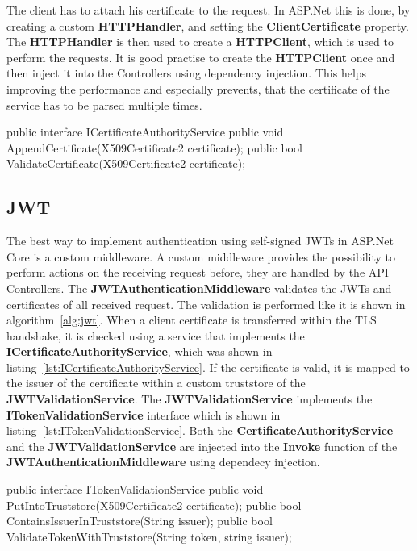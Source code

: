 The client has to attach his certificate to the request.
In ASP.Net this is done, by creating a custom \textbf{HTTPHandler}, and setting the \textbf{ClientCertificate} property.
The \textbf{HTTPHandler} is then used to create a \textbf{HTTPClient}, which is used to perform the requests.
It is good practise to create the \textbf{HTTPClient} once and then inject it into the Controllers using dependency injection.
This helps improving the performance and especially prevents, that the certificate of the service has to be parsed multiple times.

\noindent \begin{minipage}{\linewidth}
	\begin{CsCode}[label={lst:ICertificateAuthorityService}, caption={ICertificateAuthorityService interface, which is implemented by the injected CertificateAuthorityService},captionpos=b]
		public interface ICertificateAuthorityService {
			public void AppendCertificate(X509Certificate2 certificate);
			public bool ValidateCertificate(X509Certificate2 certificate);
		}
	\end{CsCode}
\end{minipage}

\subsection{JWT}
The best way to implement authentication using self-signed JWTs in ASP.Net Core is a custom middleware.
A custom middleware provides the possibility to perform actions on the receiving request before, they are handled by the API Controllers.
The \textbf{JWTAuthenticationMiddleware} validates the JWTs and certificates of all received request.
The validation is performed like it is shown in algorithm~\ref{alg:jwt}.
When a client certificate is transferred within the TLS handshake, it is checked using a service that implements the \textbf{ICertificateAuthorityService}, which was shown in listing~\ref{lst:ICertificateAuthorityService}.
If the certificate is valid, it is mapped to the issuer of the certificate within a custom truststore of the \textbf{JWTValidationService}.
The \textbf{JWTValidationService} implements the \textbf{ITokenValidationService} interface which is shown in listing~\ref{lst:ITokenValidationService}.
Both the \textbf{CertificateAuthorityService} and the \textbf{JWTValidationService} are injected into the \textbf{Invoke} function of the \textbf{JWTAuthenticationMiddleware} using dependecy injection.

\noindent \begin{minipage}{\linewidth}
	\begin{CsCode}[label={lst:ITokenValidationService}, caption={ITokenValidationService interface, which is implemented by the injected JWTValidationService},captionpos=b]
		public interface ITokenValidationService {
			public void PutIntoTruststore(X509Certificate2 certificate);
			public bool ContainsIssuerInTruststore(String issuer);
			public bool ValidateTokenWithTruststore(String token, string issuer);
		}
	\end{CsCode}
\end{minipage}

